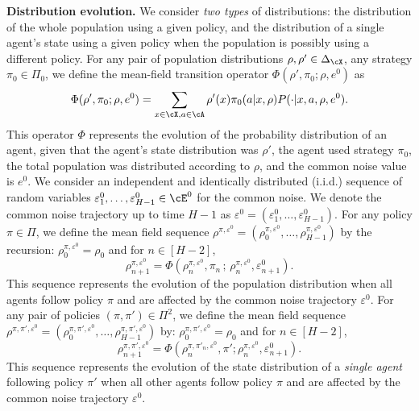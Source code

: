 \documentclass{article}
\theoremstyle{plain}
\begin{document}
\noindent\textbf{Distribution evolution.} We consider \emph{two types} of distributions: the distribution of the whole population using a given policy, and the distribution of a single agent's state using a given policy when the population is possibly using a different policy. 
For any pair of population distributions $\rho, \rho' \in \Delta_\cX$, any strategy $\pi_0 \in \Pi_0$, we define the mean-field transition operator $\Phi(\rho', \pi_0; \rho, e^0)$ as
$$
    \Phi(\rho', \pi_0; \rho, e^0) = \sum_{x \in \cX, a \in \cA} \rho'(x) \pi_0 (a \vert x, \rho) P(\cdot \vert x, a, \rho, e^0).
$$
This operator $\Phi$ represents the evolution of the probability distribution of an agent, given that the agent's state distribution was $\rho'$, the agent used strategy $\pi_0$, the total population was distributed according to $\rho$, and the common noise value is $e^0$.
We consider an independent and identically distributed (i.i.d.) sequence of random variables $\varepsilon^0_1, \dots, \varepsilon^0_{H-1} \in \cE^0$ for the common noise. We denote the common noise trajectory up to time $H-1$ as $\varepsilon^0 = (\varepsilon^0_1, \dots, \varepsilon^0_{H-1})$. For any policy $\pi \in \Pi$, we define the mean field sequence $\rho^{\pi, \varepsilon^0} = (\rho^{\pi, \varepsilon^0}_0, \dots, \rho^{\pi, \varepsilon^0}_{H-1})$ by the recursion: $\rho^{\pi, \varepsilon^0}_0 = \rho_0$ and for $n \in [H-2]$,
\begin{equation*}
        \rho^{\pi, \varepsilon^0}_{n+1} = \Phi(\rho^{\pi, \varepsilon^0}_n, \pi_n \,; \, \rho^{\pi, \varepsilon^0}_n, \varepsilon^0_{n+1}).
\end{equation*}
This sequence represents the evolution of the population distribution when all agents follow policy $\pi$ and are affected by the common noise trajectory $\varepsilon^0$. For any pair of policies $(\pi, \pi') \in \Pi^2$, we define the mean field sequence $\rho^{\pi, \pi', \varepsilon^0} = (\rho^{\pi, \pi', \varepsilon^0}_0, \dots, \rho^{\pi, \pi', \varepsilon^0}_{H-1})$ by: $\rho^{\pi, \pi', \varepsilon^0}_0 = \rho_0$ and for $n \in [H-2]$, 
\begin{equation*}
        \rho^{\pi, \pi', \varepsilon^0}_{n+1} = \Phi(\rho^{\pi, \pi'_n, \varepsilon^0}_{n}, \pi'; \rho^{\pi, \varepsilon^0}_n, \varepsilon^0_{n+1}).
\end{equation*}
This sequence represents the evolution of the state distribution of a \emph{single agent} following policy $\pi'$ when all other agents follow policy $\pi$ and are affected by the common noise trajectory $\varepsilon^0$. %
\end{document}
